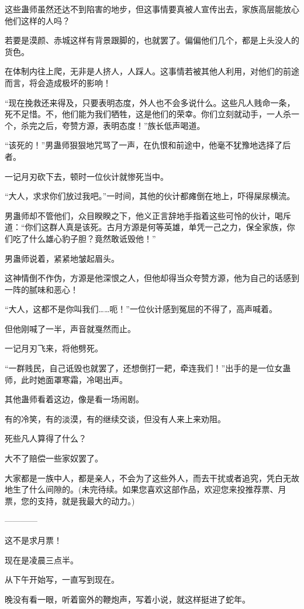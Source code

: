 \begin{this_body}
这些蛊师虽然还达不到陷害的地步，但这事情要真被人宣传出去，家族高层能放心他们这样的人吗？

若要是漠颜、赤城这样有背景跟脚的，也就罢了。偏偏他们几个，都是上头没人的货色。

在体制内往上爬，无非是人挤人，人踩人。这事情若被其他人利用，对他们的前途而言，将会造成极坏的影响！

“现在挽救还来得及，只要表明态度，外人也不会多说什么。这些凡人贱命一条，死不足惜。不，他们能为我们牺牲，这是他们的荣幸。你们立刻就动手，一人杀一个，杀完之后，夸赞方源，表明态度！”族长低声喝道。

“该死的！”男蛊师狠狠地咒骂了一声，在仇恨和前途中，他毫不犹豫地选择了后者。

一记月刃砍下去，顿时一位伙计就惨死当中。

“大人，求求你们放过我吧。”一时间，其他的伙计都瘫倒在地上，吓得屎尿横流。

男蛊师却不管他们，众目睽睽之下，他义正言辞地手指着这些可怜的伙计，喝斥道：“你们这群人真是该死。古月方源是何等英雄，单凭一己之力，保全家族，你们吃了什么雄心豹子胆？竟然敢诋毁他！”

男蛊师说着，紧紧地皱起眉头。

这神情倒不作伪，方源是他深恨之人，但他却得当众夸赞方源，他为自己的话感到一阵的腻味和恶心！

“大人，这都不是你叫我们……呃！”一位伙计感到冤屈的不得了，高声喊着。

但他刚喊了一半，声音就戛然而止。

一记月刃飞来，将他劈死。

“一群贱民，自己诋毁也就罢了，还想倒打一耙，牵连我们！”出手的是一位女蛊师，此时她面罩寒霜，冷喝出声。

其他蛊师看着这边，像是看一场闹剧。

有的冷笑，有的淡漠，有的继续交谈，但没有人来上来劝阻。

死些凡人算得了什么？

大不了赔偿一些家奴罢了。

大家都是一族中人，都是亲人，不会为了这些外人，而去干扰或者追究，凭白无故地生了什么间隙的。(未完待续。如果您喜欢这部作品，欢迎您来投推荐票、月票，您的支持，就是我最大的动力。)

------------

这不是求月票！

现在是凌晨三点半。

从下午开始写，一直写到现在。

晚没有看一眼，听着窗外的鞭炮声，写着小说，就这样挺进了蛇年。


\end{this_body}
